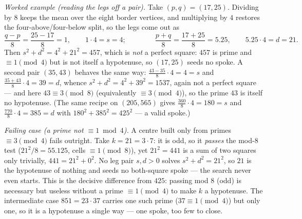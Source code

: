 \documentclass[11pt]{article}
\theoremstyle{definition}
\begin{document}
\medskip\noindent\emph{Worked example (reading the legs off a pair).} Take $(p,q)=(17,25)$.
Dividing by $8$ keeps the mean over the eight border vertices, and multiplying by $4$
restores the four-above/four-below split, so the legs come out as
\[
  \frac{q-p}{8}=\frac{25-17}{8}=1,\qquad 1\cdot4=s=4;
  \qquad\qquad
  \frac{p+q}{8}=\frac{17+25}{8}=5.25,\qquad 5.25\cdot4=d=21 .
\]
Then $s^2+d^2=4^2+21^2=457$, which is \emph{not} a perfect square: $457$ is prime and
$\equiv1\pmod4$ but is not itself a hypotenuse, so $(17,25)$ seeds no spoke. A second pair
$(35,43)$ behaves the same way: $\tfrac{43-35}{8}\cdot4=4=s$ and
$\tfrac{35+43}{8}\cdot4=39=d$, whence $s^2+d^2=4^2+39^2=1537$, again not a perfect square
--- and here $43\equiv3\pmod8$ (equivalently $\equiv3\pmod4$), so the prime $43$ is itself
no hypotenuse. (The same recipe on $(205,565)$ gives $\tfrac{360}{8}\cdot4=180=s$ and
$\tfrac{770}{8}\cdot4=385=d$ with $180^2+385^2=425^2$ --- a valid spoke.)

\medskip\noindent\emph{Failing case (a prime not $\equiv1\bmod4$).} A centre built only from
primes $\equiv3\pmod4$ fails outright. Take $k=21=3\cdot7$: it is odd, so it \emph{passes}
the mod-$8$ test ($21^2/8=55.125$, cells $\equiv1\pmod8$), yet $21^2=441$ is a sum of two
squares only trivially, $441=21^2+0^2$. No leg pair $s,d>0$ solves $s^2+d^2=21^2$, so $21$ is
the hypotenuse of nothing and seeds no both-square spoke --- the search never even starts.
This is the decisive difference from $425$: passing mod $8$ (odd) is necessary but useless
without a prime $\equiv1\pmod4$ to make $k$ a hypotenuse. The intermediate case
$851=23\cdot37$ carries one such prime ($37\equiv1\pmod4$) but only one, so it is a
hypotenuse a single way --- one spoke, too few to close.
\end{document}
